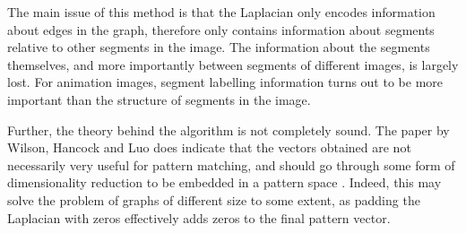 The main issue of this method is that the Laplacian only encodes information about edges in the graph, therefore only contains information about segments relative to other segments in the image. The information about the segments themselves, and more importantly between segments of different images, is largely lost. For animation images, segment labelling information turns out to be more important than the structure of segments in the image.

Further, the theory behind the algorithm is not completely sound. The paper by Wilson, Hancock and Luo does indicate that the vectors obtained are not necessarily very useful for pattern matching, and should go through some form of dimensionality reduction to be embedded in a pattern space \cite{wilson2005pattern}. Indeed, this may solve the problem of graphs of different size to some extent, as padding the Laplacian with zeros effectively adds zeros to the final pattern vector.

